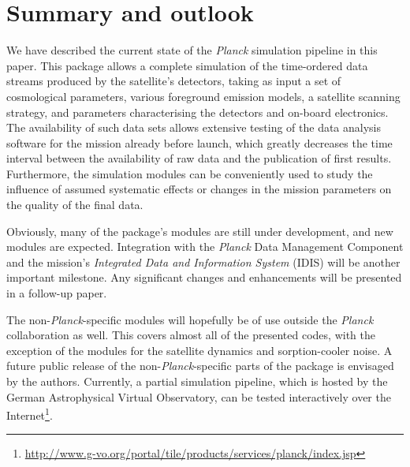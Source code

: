 \documentclass{aa}
\begin{document}
\section {Summary and outlook}
\label{summary}

We have described the current state of the \emph{Planck}
simulation pipeline in this paper. This package allows a complete simulation of
the time-ordered data streams produced by the satellite's detectors, taking as input
a set of cosmological parameters, various foreground emission models, a satellite
scanning strategy, and parameters characterising the detectors and on-board
electronics. The availability of such data sets allows extensive testing of the data
analysis software for the mission already before launch, which greatly decreases the time
interval between the availability of raw data and the publication of first results.
Furthermore, the simulation modules can be conveniently used to study the influence
of assumed systematic effects or changes in the mission parameters on the quality of the
final data.

Obviously, many of the package's modules are still
under development, and new modules are expected.
Integration with the \emph{Planck} Data Management Component and the
mission's \emph{Integrated Data and Information System} (IDIS) will be
another important milestone. Any significant changes and enhancements
will be presented in a follow-up paper.

The non-\emph{Planck}-specific modules will hopefully be of use outside the \emph{Planck}
collaboration as well. This covers almost all of the presented codes,
with the exception of the modules for the satellite dynamics and
sorption-cooler noise. A future public release of the non-\emph{Planck}-specific parts
of the package is envisaged by the authors. Currently, a partial simulation
pipeline, which is hosted by the German Astrophysical Virtual Observatory, can be tested
interactively over the Internet\footnote{\href{http://www.g-vo.org/portal/tile/products/services/planck/index.jsp}{http://www.g-vo.org/portal/tile/products/services/planck/index.jsp}}.
\end{document}
